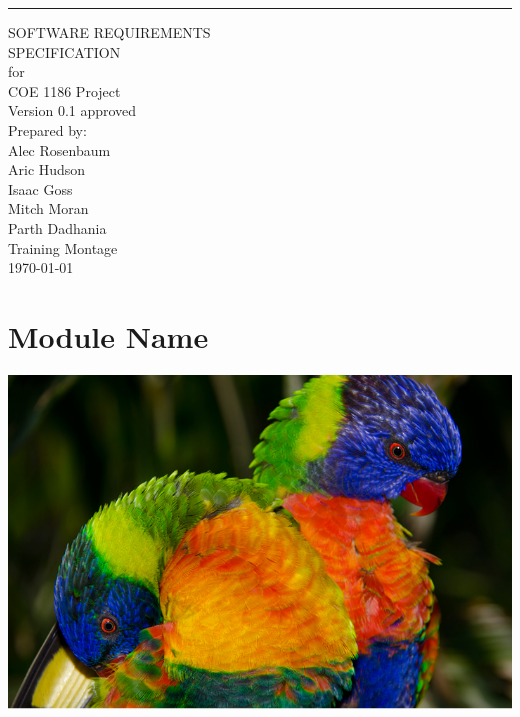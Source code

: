 \documentclass{scrreprt}
\date{}
\def\myversion{0.1 }
\begin{document}
\begin{flushright}
    \rule{16cm}{5pt}\vskip1cm
    \begin{bfseries}
        \Huge{SOFTWARE REQUIREMENTS\\ SPECIFICATION}\\
        \vspace{.9cm}
        for\\
        \vspace{.9cm}
        COE 1186 Project\\
        \vspace{.9cm}
        \LARGE{Version \myversion approved}\\
        \vspace{.9cm}
        Prepared by:\\
        Alec Rosenbaum\\
        Aric Hudson\\
        Isaac Goss\\
        Mitch Moran\\
        Parth Dadhania\\
        \vspace{1.9cm}
        Training Montage\\
        \vspace{.9cm}
        \today\\
    \end{bfseries}
\end{flushright}

\tableofcontents

\chapter{Module Name}

\includegraphics[width=\textwidth]{sample}
\end{document}
